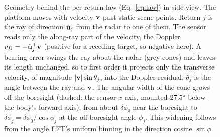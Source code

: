 \begin{figure}[t]
\caption{Geometry behind the per-return law (Eq.~\eqref{eq:law}) in side view.
The platform moves with velocity $\mathbf{v}$ past static scene points.  Return $j$ is the ray of direction $\hat{\mathbf{u}}_j$ from the radar to one of them.  The sensor reads only the along-ray part of the velocity, the Doppler $v_{D}=-\hat{\mathbf{u}}_j^{\top}\mathbf{v}$ (positive for a receding target, so negative here).
A bearing error swings the ray about the radar (grey cones) and leaves its length unchanged, so to first order it projects only the transverse velocity, of magnitude $|\mathbf{v}|\sin\theta_j$, into the Doppler residual.  $\theta_j$ is the angle between the ray and $\mathbf{v}$.
The angular width of the cone grows off the boresight (dashed: the sensor $x$ axis, mounted $27.5\degree$ below the body's forward axis), from about $\delta\phi_0$ near the boresight to $\delta\phi_j = \delta\phi_0/\cos\phi_j$ at the off-boresight angle $\phi_j$.  This widening follows from the angle FFT's uniform binning in the direction cosine $\sin\phi$.}
\label{fig:geometry}
\end{figure}

